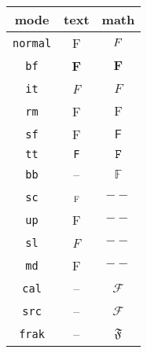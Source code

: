 \documentclass{standalone}
\begin{document}
\begin{tabular}{ccc}\toprule
mode & text & math
\\ \midrule
   \verb|normal| & \textnormal{F}  & $\mathnormal{F}$
\\ \verb|bf|     & \textbf{F}      & $\mathbf{F}$
\\ \verb|it|     & \textit{F}      & $\mathit{F}$
\\ \verb|rm|     & \textrm{F}      & $\mathrm{F}$
\\ \verb|sf|     & \textsf{F}      & $\mathsf{F}$
\\ \verb|tt|     & \texttt{F}      & $\mathtt{F}$
\\ \verb|bb|     & --              & $\mathbb{F}$
\\ \verb|sc|     & \textsc{f}      & $--$
\\ \verb|up|     & \textup{F}      & $--$
\\ \verb|sl|     & \textsl{F}      & $--$
\\ \verb|md|     & \textmd{F}      & $--$
\\ \verb|cal|    & --              & $\mathcal{F}$
\\ \verb|src|    & --              & $\mathscr{F}$
\\ \verb|frak|   & --              & $\mathfrak{F}$
\\ \bottomrule
\end{tabular}

\end{document}
